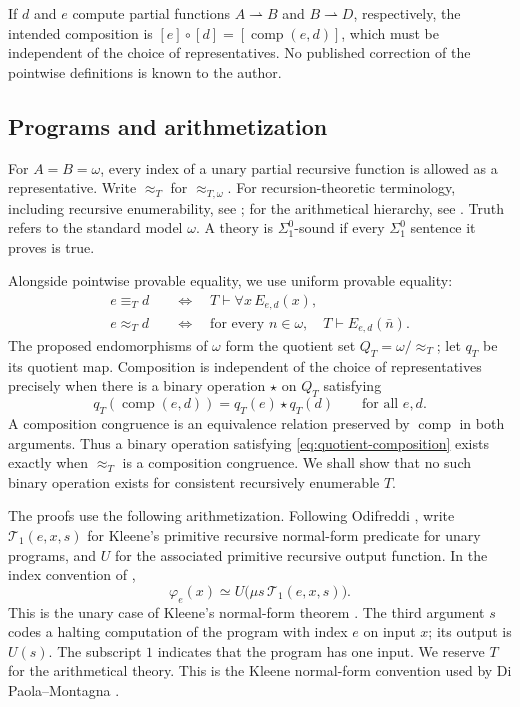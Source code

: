 \documentclass[11pt]{article}
\newcommand{\comp}{\operatorname{comp}}
\begin{document}
If $d$ and $e$ compute partial functions
$A\rightharpoonup B$ and $B\rightharpoonup D$, respectively, the intended
composition is $[e]\circ[d]=[\comp(e,d)]$,
which must be independent of the choice of representatives.
No published correction of the pointwise definitions is known to the author.

\subsection{Programs and arithmetization}\label{sec:arithmetization}

For $A=B=\omega$, every index of a unary partial recursive function is
allowed as a representative. Write $\approx_T$ for
$\approx_{T,\omega}$.
For recursion-theoretic terminology, including recursive enumerability,
see \cite{Rogers,Odifreddi}; for the arithmetical hierarchy, see
\cite[Definition~IV.1.6, p.~367]{Odifreddi}.
Truth refers to the standard model $\omega$.
A theory is $\Sigma^0_1$-sound if every $\Sigma^0_1$ sentence it proves
is true.

Alongside pointwise provable equality, we use uniform provable equality:
\begin{align}
 e\equiv_T d
 &\quad\Longleftrightarrow\quad T\vdash\forall x\,E_{e,d}(x),
 \label{eq:uniform}\\
 e\approx_T d
 &\quad\Longleftrightarrow\quad
 \text{for every }n\in\omega,\quad T\vdash E_{e,d}(\bar n).
 \label{eq:pointwise}
\end{align}
The proposed endomorphisms of $\omega$ form the quotient set
$Q_T=\omega/{\approx_T}$; let $q_T$ be its quotient map.
Composition is independent of the choice of representatives precisely
when there is a binary operation $\star$ on $Q_T$ satisfying
\begin{equation}\label{eq:quotient-composition}
 q_T(\comp(e,d))=q_T(e)\star q_T(d)
 \qquad\text{for all }e,d.
\end{equation}
A composition congruence is an equivalence relation preserved by
$\comp$ in both arguments. Thus a binary operation satisfying
\eqref{eq:quotient-composition} exists exactly when $\approx_T$ is a
composition congruence.
We shall show that no such binary operation exists for consistent
recursively enumerable $T$.

The proofs use the following arithmetization.
Following Odifreddi
\cite[Theorem~II.1.2, p.~129]{Odifreddi}, write $\mathcal{T}_1(e,x,s)$ for Kleene's
primitive recursive normal-form predicate for unary programs, and $U$
for the associated primitive recursive output function.
In the index convention of \cite[Definition~II.1.4, p.~130]{Odifreddi},
\[
 \varphi_e(x)\simeq U\bigl(\mu s\,\mathcal{T}_1(e,x,s)\bigr).
\]
This is the unary case of Kleene's normal-form theorem
\cite[\S63, Theorem~XIX(a), p.~330]{Kleene}.
The third argument $s$ codes a halting computation of the program with
index $e$ on input $x$; its output is $U(s)$.
The subscript $1$ indicates that the program has one input.
We reserve $T$ for the arithmetical theory.
This is the
Kleene normal-form convention used by Di Paola--Montagna
\cite[p.~645]{DiPaolaMontagna}.
\end{document}
